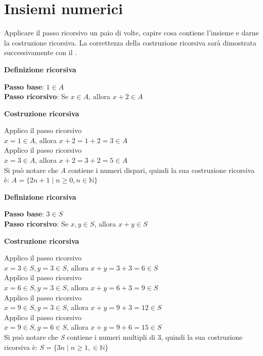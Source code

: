 \section{Insiemi numerici}
Applicare il passo ricorsivo un paio di volte, capire cosa contiene l'insieme e darne la costruzione ricorsiva. La correttezza della costruzione ricorsiva sarà dimostrata successivamente con il .
\begin{example}
\phantom{}
\centerline{\textbf{Definizione ricorsiva}}
\textbf{Passo base}: $1 \in A$ \\
\textbf{Passo ricorsivo}: Se $x \in A$, allora $x + 2 \in A$ \\ 
\centerline{\textbf{Costruzione ricorsiva}}
Applico il passo ricorsivo \\
$x = 1 \in A$, allora $x + 2 = 1 + 2 = 3 \in A$ \\
Applico il passo ricorsivo \\
$x = 3 \in A$, allora $x + 2 = 3 + 2 = 5 \in A$ \\

Si può notare che \textit{A} contiene i numeri dispari, quindi la sua costruzione ricorsiva è: $A = \{2n + 1 \mid n \geq 0, n \in \mathbb{N}\}$
\end{example}

\begin{example}
\phantom{}
\centerline{\textbf{Definizione ricorsiva}}
\textbf{Passo base}: $3 \in S$ \\
\textbf{Passo ricorsivo}: Se $x, y \in S$, allora $x + y \in S$ \\
\centerline{\textbf{Costruzione ricorsiva}}
Applico il passo ricorsivo \\
$x = 3 \in S, y = 3 \in S$, allora $x + y = 3 + 3 = 6 \in S$ \\
Applico il passo ricorsivo \\
$x = 6 \in S, y = 3 \in S$, allora $x + y = 6 + 3 = 9 \in S$ \\
Applico il passo ricorsivo \\
$x = 9 \in S, y = 3 \in S$, allora $x + y = 9 + 3 = 12 \in S$ \\
Applico il passo ricorsivo \\
$x = 9 \in S, y = 6 \in S$, allora $x + y = 9 + 6 = 15 \in S$ \\

Si può notare che \textit{S} contiene i numeri multipli di 3, quindi la sua costruzione ricorsiva è: $S = \{3n \mid n \geq 1, \in \mathbb{N}\}$
\end{example}

